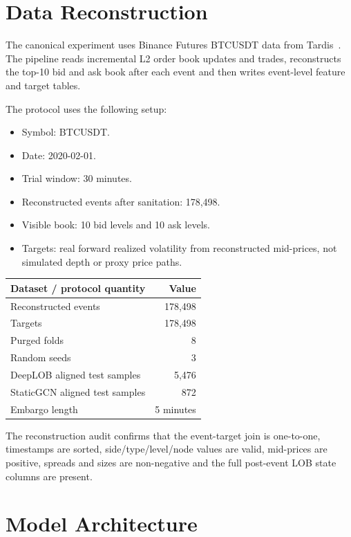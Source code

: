 \documentclass[11pt]{article}
\begin{document}
\section{Data Reconstruction}

The canonical experiment uses Binance Futures BTCUSDT data from Tardis~\cite{tardisdocs}. The pipeline reads incremental L2 order book updates and trades, reconstructs the top-10 bid and ask book after each event and then writes event-level feature and target tables.

The protocol uses the following setup:

\begin{itemize}
  \item Symbol: BTCUSDT.
  \item Date: 2020-02-01.
  \item Trial window: 30 minutes.
  \item Reconstructed events after sanitation: 178,498.
  \item Visible book: 10 bid levels and 10 ask levels.
  \item Targets: real forward realized volatility from reconstructed mid-prices, not simulated depth or proxy price paths.
\end{itemize}

\begin{center}
\begin{tabular}{lr}
\toprule
Dataset / protocol quantity & Value \\
\midrule
Reconstructed events & 178,498 \\
Targets & 178,498 \\
Purged folds & 8 \\
Random seeds & 3 \\
DeepLOB aligned test samples & 5,476 \\
StaticGCN aligned test samples & 872 \\
Embargo length & 5 minutes \\
\bottomrule
\end{tabular}
\end{center}

The reconstruction audit confirms that the event-target join is one-to-one, timestamps are sorted, side/type/level/node values are valid, mid-prices are positive, spreads and sizes are non-negative and the full post-event LOB state columns are present.

\section{Model Architecture}
\end{document}
